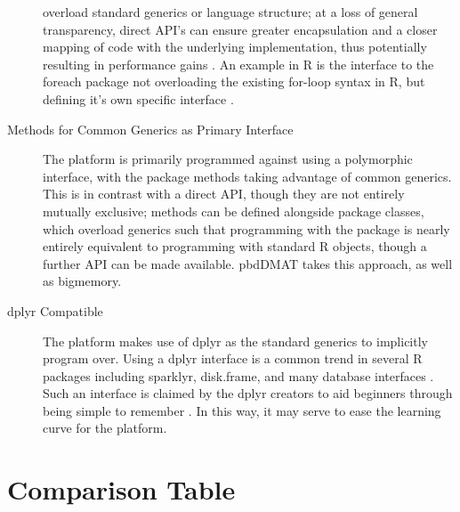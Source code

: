 \documentclass[a4paper,10pt]{article}
\begin{document}
\begin{description}
	      overload standard generics or language structure;
	      at a loss of general transparency, direct API's can ensure
	      greater encapsulation and a closer mapping of code with the
	      underlying implementation, thus potentially resulting in
	      performance gains \cite{bierhoff2009api}.
	      An example in R is the interface to the foreach package not
	      overloading the existing for-loop syntax in R, but defining it's
	      own specific interface \cite{microsoft20}. 
      \item[Methods for Common Generics as Primary Interface]
	      The platform is primarily programmed against using a polymorphic interface,
	      with the package methods taking advantage of common generics.
	      This is in contrast with a direct API, though they are not entirely
	      mutually exclusive;
	      methods can be defined alongside package classes, which overload
	      generics such that programming with the package is nearly
	      entirely equivalent to programming with standard R objects,
	      though a further API can be made available.
	      pbdDMAT takes this approach, as well as
	      bigmemory\cite{pbdDMATpackage}\cite{kane13:bigmemory}.
	\item[dplyr Compatible]
	      The platform makes use of dplyr as the standard generics to
	      implicitly program over.
	      Using a dplyr interface is a common trend in several R packages
	      including sparklyr, disk.frame, and many database interfaces
	      \cite{luraschi20}\cite{zj20}.
	      Such an interface is claimed by the dplyr creators to aid
	      beginners through being simple to remember \cite{wickham2019welcome}.
	      In this way, it may serve to ease the learning curve for the platform.
\end{description}

\section{Comparison Table}\label{sec:comp-tab}
\end{document}
